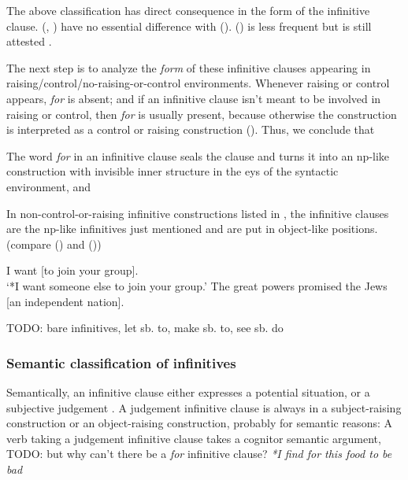 \documentclass[UTF8, a4paper, oneside, scheme=plain]{ctexrep}
\newcommand*{\citepage}[1]{p.~{#1}}
\newcommand{\corpus}[1]{\emph{#1}}
\newcommand{\translate}[1]{`#1'}
\begin{document}
The above classification has direct consequence in the form of the infinitive clause.
(,
)
have no essential difference with ().
() is less frequent 
but is still attested \citep[\citepage{243}]{dixon2005semantic}.

The next step is to analyze the \emph{form} of these infinitive clauses
appearing in raising/control/no-raising-or-control environments.
Whenever raising or control appears, \corpus{for} is absent;
and if an infinitive clause isn't meant to be involved in raising or control,
then \corpus{for} is usually present,
because otherwise the construction 
is interpreted as a control or raising construction 
().
Thus, we conclude that \begin{enumerate*}
    \item The word \corpus{for} in an infinitive clause seals the clause 
    and turns it into an \acs{np}-like construction 
    with invisible inner structure in the eys of the syntactic environment, and 
    \item In non-control-or-raising infinitive constructions listed 
    in ,
    the infinitive clauses are the \acs{np}-like infinitives just mentioned  
    and are put in object-like positions.
    (compare () and 
    ())
\end{enumerate*}

\begin{exe}
    \ex\label{ex:complement.infinitive.preference-control-reading} I want [to join your group]. \\
    \translate{*I want someone else to join your group.}
    \ex\label{ex:complement.infinitive.promise-np-object} The great powers promised the Jews [an independent nation].
\end{exe}

TODO: bare infinitives, let sb. to, make sb. to, see sb. do \citet[\citepage{1236},\citepage{1254}]{cgel}

\subsubsection{Semantic classification of infinitives}

Semantically, an infinitive clause either expresses a potential situation,
or a subjective judgement \citep[\citepage{245}]{dixon2005semantic}.
A judgement infinitive clause 
is always in a subject-raising construction or an object-raising construction,
probably for semantic reasons:
A verb taking a judgement infinitive clause 
takes a cognitor semantic argument,
TODO: but why can't there be a \corpus{for} infinitive clause? 
\corpus{*I find for this food to be bad}
\end{document}
